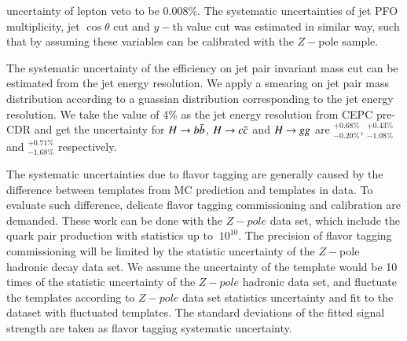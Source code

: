 uncertainty of lepton veto to be 0.008\%.  
The systematic uncertainties of jet PFO multiplicity, jet $\cos \theta$ cut 
and $y-$th value cut was estimated in similar way, such that by assuming these variables can be 
calibrated with the $Z-$pole sample. \par
The systematic uncertainty of the efficiency on jet pair invariant mass cut can be 
estimated from the jet energy resolution. We apply a smearing on jet pair mass distribution according to a guassian distribution corresponding to the jet energy resolution. 
We take the value of 4\% as the jet energy resolution from CEPC pre-CDR\cite{CEPC_preCDR} and get the uncertainty for $H\rightarrow b\bar{b}$, $H\rightarrow c\bar{c}$ and $H\rightarrow gg$ are $^{+0.68\%}_{-0.20\%}$, $^{+0.43\%}_{-1.08\%}$ and $^{+0.71\%}_{-1.68\%}$  respectively.\par
The systematic uncertainties due to flavor tagging are generally caused by the 
difference between templates from MC prediction and templates in data. 
To evaluate such difference, delicate flavor tagging commissioning and calibration 
are demanded. These work can be done with the $Z-pole$ data set, which include the 
quark pair production with statistics up to $~10^{10}$. The precision of flavor 
tagging commissioning will be limited by the statistic uncertainty of the 
$Z-$pole hadronic decay data set. We assume the uncertainty of the template would be 
10 times of the statistic uncertainty of the $Z-pole$ hadronic data set, and fluctuate 
the templates according to $Z-pole$ data set statistics uncertainty and fit to the dataset with fluctuated templates. The standard deviations of the fitted signal strength are taken as flavor tagging systematic uncertainty.\par

